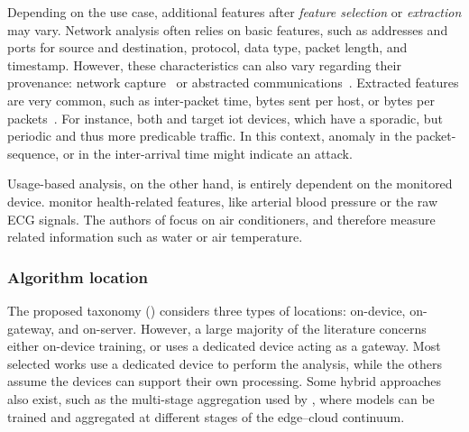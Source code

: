 Depending on the use case, additional features after \emph{feature selection} or \emph{extraction} may vary.
Network analysis often relies on basic features, such as addresses and ports for source and destination, protocol, data type, packet length, and timestamp.
However, these characteristics can also vary regarding their provenance: network capture~\cite{kddcup99,tavallaee_detailedanalysisKDD_2009} or abstracted communications~\cite{pahl_AllEyesYou_2018}.
Extracted features are very common, such as inter-packet time, bytes sent per host, or bytes per packets~\cite{buczak_SurveyDataMining_2016,chaabouni_NetworkIntrusionDetection_2019}.
For instance, both \textcite{nguyen_DIoTFederatedSelflearning_2019} and \textcite{pahl_AllEyesYou_2018} target \gls{iot} devices, which have a sporadic, but periodic and thus more predicable traffic.
In this context, anomaly in the packet-sequence, or in the inter-arrival time might indicate an attack.

Usage-based analysis, on the other hand, is entirely dependent on the monitored device.
\textcite{schneble_Attackdetectionusing_2019} monitor health-related features, like arterial blood pressure or the raw ECG signals.
The authors of \cite{zhang_BlockchainbasedFederatedLearning_2020} focus on air conditioners, and therefore measure related information such as water or air temperature.


\subsubsection{Algorithm location\label{sec:sota.quali.location}}

The proposed taxonomy () considers three types of locations: on-device, on-gateway, and on-server.
However, a large majority of the literature concerns either on-device training, or uses a dedicated device acting as a gateway.
Most selected works use a dedicated device to perform the analysis, while the others assume the devices can support their own processing.
Some hybrid approaches also exist, such as the multi-stage aggregation used by \textcite{liu_BlockchainFederatedLearning_2021}, where models can be trained and aggregated at different stages of the edge--cloud continuum.

